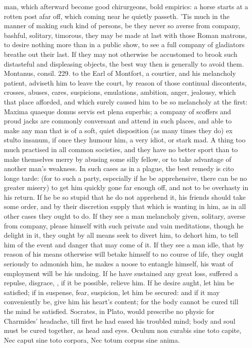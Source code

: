 {man, which afterward become good chirurgeons, bold empirics: a horse
starts at a rotten post afar off, which coming near he quietly passeth.
'Tis much in the manner of making such kind of persons, be they never
so averse from company, bashful, solitary, timorous, they may be made
at last with those Roman matrons, to desire nothing more than in a
public show, to see a full company of gladiators breathe out their
last.
If they may not otherwise be accustomed to brook such distasteful and
displeasing objects, the best way then is generally to avoid them.
Montanus, consil. 229. to the Earl of Montfort, a courtier, and his
melancholy patient, adviseth him to leave the court, by reason of those
continual discontents, crosses, abuses, cares, suspicions,
emulations, ambition, anger, jealousy, which that place afforded, and
which surely caused him to be so melancholy at the first: Maxima
quaeque domus servis est plena superbis; a company of scoffers and
proud jacks are commonly conversant and attend in such places, and able
to make any man that is of a soft, quiet disposition (as many times
they do) ex stulto insanum, if once they humour him, a very idiot, or
stark mad. A thing too much practised in all common societies, and they
have no better sport than to make themselves merry by abusing some
silly fellow, or to take advantage of another man's weakness. In such
cases as in a plague, the best remedy is cito longe tarde: (for to such
a party, especially if he be apprehensive, there can be no greater
misery) to get him quickly gone far enough off, and not to be overhasty
in his return. If he be so stupid that he do not apprehend it, his
friends should take some order, and by their discretion supply that
which is wanting in him, as in all other cases they ought to do. If
they see a man melancholy given, solitary, averse from company, please
himself with such private and vain meditations, though he delight in
it, they ought by all means seek to divert him, to dehort him, to tell
him of the event and danger that may come of it. If they see a man
idle, that by reason of his means otherwise will betake himself to no
course of life, they ought seriously to admonish him, he makes a noose
to entangle himself, his want of employment will be his undoing. If he
have sustained any great loss, suffered a repulse, disgrace, \etc{}, if it
be possible, relieve him. If he desire aught, let him be satisfied; if
in suspense, fear, suspicion, let him be secured: and if it may
conveniently be, give him his heart's content; for the body cannot be
cured till the mind be satisfied.  Socrates, in Plato, would
prescribe no physic for Charmides' headache, till first he had eased
his troubled mind; body and soul must be cured together, as head and
eyes.
Oculum non curabis sine toto capite,
Nec caput sine toto corpora,
Nec totum corpus sine anima.

}
